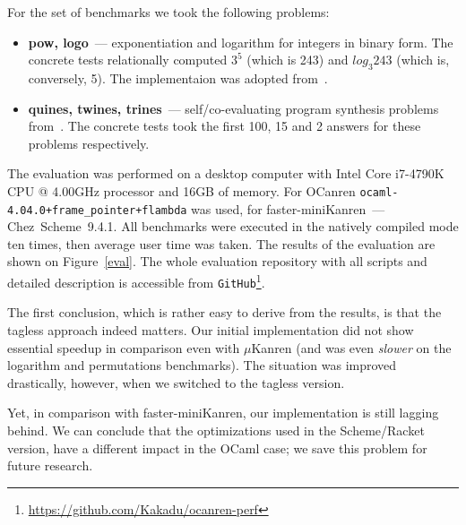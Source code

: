 \FloatBarrier

For the set of benchmarks we took the following problems:

\begin{itemize}
\item \textbf{pow, logo}~--- exponentiation and logarithm for integers in binary form. The concrete tests relationally computed
$3^5$ (which is 243) and $log_3 243$ (which is, conversely, 5). The implementaion was adopted from~\cite{KiselyovArithm}.
\item \textbf{quines, twines, trines}~--- self/co-evaluating program synthesis problems from~\cite{Untagged}. The
concrete tests took the first 100, 15 and 2 answers for these problems respectively.
\end{itemize}


The evaluation was performed on a desktop computer with Intel Core i7-4790K CPU @ 4.00GHz processor and 16GB of memory.
For OCanren \texttt{ocaml-4.04.0+frame\_pointer+flambda} was used,
for faster-miniKanren~--- Chez~Scheme~9.4.1.
All benchmarks were executed in the natively compiled mode ten times, then average user time was taken. The results of the evaluation
are shown on Figure~\ref{eval}. The whole evaluation repository with all scripts and detailed description is accessible
from \lstinline{GitHub}\footnote{\url{https://github.com/Kakadu/ocanren-perf}}.

The first conclusion, which is rather easy to derive from the results, is that the tagless approach indeed matters. Our initial
implementation did not show essential speedup in comparison even with $\mu$Kanren (and was even \emph{slower} on the logarithm
and permutations benchmarks). The situation was improved drastically, however, when we switched to the tagless version.

Yet, in comparison with faster-miniKanren, our implementation is still lagging behind. We can conclude that the optimizations
used in the Scheme/Racket version, have a different impact in the OCaml case; we save this problem for future research.

